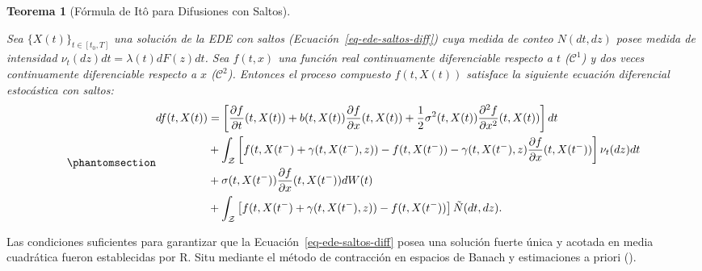 \documentclass[
  spanish,
  us-letterpaper,
]{scrreprt}
\numberwithin{equation}{section}
\theoremstyle{plain}
\newtheorem{theorem}{Teorema}[chapter]
\theoremstyle{plain}
\theoremstyle{definition}
\theoremstyle{plain}
\theoremstyle{remark}
\begin{document}
\begin{theorem}[Fórmula de Itô para Difusiones con
Saltos]\protect\hypertarget{thm-ito-saltos-fijo}{}\label{thm-ito-saltos-fijo}

Sea \(\{X(t)\}_{t \in [t_0, T]}\) una solución de la EDE con saltos
(Ecuación~\ref{eq-ede-saltos-diff}) cuya medida de conteo \(N(dt, dz)\)
posee medida de intensidad \(\nu_t(dz)dt = \lambda(t)dF(z)dt\). Sea
\(f(t, x)\) una función real continuamente diferenciable respecto a
\(t\) (\(\mathcal{C}^1\)) y dos veces continuamente diferenciable
respecto a \(x\) (\(\mathcal{C}^2\)). Entonces el proceso compuesto
\(f(t, X(t))\) satisface la siguiente ecuación diferencial estocástica
con saltos: \begin{equation}\phantomsection\label{eq-ito-saltos-fijo}{
\begin{aligned}
df(t, X(t)) &=  \left[ \frac{\partial f}{\partial t}(t, X(t)) + b(t, X(t))\frac{\partial f}{\partial x}(t, X(t)) + \frac{1}{2}\sigma^2(t, X(t))\frac{\partial^2 f}{\partial x^2}(t, X(t)) \right] dt \\
& + \int_{\mathcal{Z}} \left[ f(t, X(t^-) + \gamma(t, X(t^-), z)) - f(t, X(t^-)) - \gamma(t, X(t^-), z)\frac{\partial f}{\partial x}(t, X(t^-)) \right] \nu_t(dz) dt \\
& + \sigma(t, X(t^-))\frac{\partial f}{\partial x}(t, X(t^-)) dW(t) \\
& + \int_{\mathcal{Z}} \left[ f(t, X(t^-) + \gamma(t, X(t^-), z)) - f(t, X(t^-)) \right] \tilde{N}(dt, dz).
\end{aligned}
}\end{equation}

\end{theorem}

Las condiciones suficientes para garantizar que la
Ecuación~\ref{eq-ede-saltos-diff} posea una solución fuerte única y
acotada en media cuadrática fueron establecidas por R. Situ mediante el
método de contracción en espacios de Banach y estimaciones a priori
().
\end{document}
